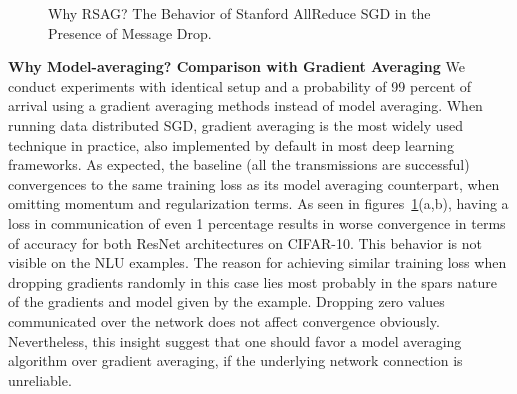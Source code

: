 \documentclass{article}
\renewcommand{\paragraph}[1]{\noindent\textbf{#1}}
\newcounter{thm_counter}
\begin{document}
\begin{figure}[tbp]
	\centering
    \caption{Why RSAG? The Behavior of Stanford AllReduce SGD in the Presence of Message Drop.}
    \label{fig:grad}
\end{figure}

\paragraph{Why Model-averaging? Comparison with Gradient Averaging} We conduct experiments with identical setup and a probability of 99 percent of arrival using a gradient averaging methods instead of model averaging. When running data distributed SGD, gradient averaging is the most widely used technique in practice, also implemented by default in most deep learning frameworks\cite{abadi2016tensorflow, seide2016cntk}. As expected, the baseline (all the transmissions are successful) convergences to the same training loss as its model averaging counterpart, when omitting momentum and regularization terms. As seen in figures~\ref{fig:grad}(a,b), having a loss in communication of even 1 percentage results in worse convergence in terms of accuracy for both ResNet architectures on CIFAR-10. This behavior is not visible on the NLU examples. The reason for achieving similar training loss when dropping gradients randomly in this case lies most probably in the spars nature of the gradients and model given by the example. Dropping zero values communicated over the network does not affect convergence obviously. Nevertheless, this insight suggest that one should favor a model averaging algorithm over gradient averaging, if the underlying network connection is unreliable.
\end{document}
